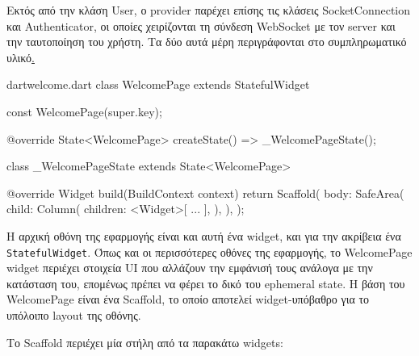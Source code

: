 \documentclass[../thesis.tex]{subfiles}
\begin{document}
Εκτός από την κλάση User, ο provider παρέχει επίσης τις κλάσεις SocketConnection και Authenticator, οι οποίες χειρίζονται τη σύνδεση WebSocket με τον server και την ταυτοποίηση του χρήστη.
Τα δύο αυτά μέρη περιγράφονται στο συμπληρωματικό υλικό\hyperref[sec:authentication].

\begin{codeblock}{dart}{welcome.dart}
  class WelcomePage extends StatefulWidget {
    const WelcomePage({super.key});
  
    @override
    State<WelcomePage> createState() => _WelcomePageState();
  }

  class _WelcomePageState extends State<WelcomePage> {

    @override
    Widget build(BuildContext context) {
      return Scaffold(
        body: SafeArea(
          child: Column(
            children: <Widget>[
              ...
            ],
          ),
        ),
      );
    }
  }
\end{codeblock}

Η αρχική οθόνη της εφαρμογής είναι και αυτή ένα widget, και για την ακρίβεια ένα \verb|StatefulWidget|.
Όπως και οι περισσότερες οθόνες της εφαρμογής, το WelcomePage widget περιέχει στοιχεία UI που αλλάζουν την εμφάνισή τους ανάλογα με την κατάσταση του, επομένως πρέπει να φέρει το δικό του ephemeral state.
Η βάση του WelcomePage είναι ένα Scaffold, το οποίο αποτελεί widget-υπόβαθρο για το υπόλοιπο layout της οθόνης.

Το Scaffold περιέχει μία στήλη από τα παρακάτω widgets:
\end{document}
